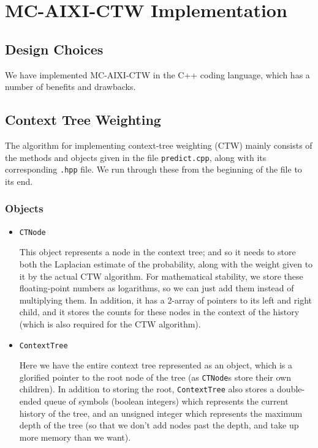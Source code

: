 \documentclass[pdftex,twoside,a4paper]{report}
\begin{document}
\chapter{MC-AIXI-CTW Implementation}
\section{Design Choices}

We have implemented MC-AIXI-CTW in the C++ coding language, which has a number of benefits and drawbacks. 

\section{Context Tree Weighting}
The algorithm for implementing context-tree weighting (CTW) mainly consists of the methods and objects given in the file \texttt{predict.cpp}, along with its corresponding \texttt{.hpp} file. We run through these from the beginning of the file to its end.  

\subsection{Objects}
\begin{itemize}
\item{\texttt{CTNode}

This object represents a node in the context tree; and so it needs to store both the Laplacian estimate of the probability, along with the weight given to it by the actual CTW algorithm. For mathematical stability, we store these floating-point numbers as logarithms, so we can just add them instead of multiplying them. In addition, it has a 2-array of pointers to its left and right child, and it stores the counts for these nodes in the context of the history (which is also required for the CTW algorithm).
  }
\item{\texttt{ContextTree}

Here we have the entire context tree represented as an object, which is a glorified pointer to the root node of the tree (as \texttt{CTNode}s store their own children). In addition to storing the root, \texttt{ContextTree} also stores a double-ended queue of symbols (boolean integers) which represents the current history of the tree, and an unsigned integer which represents the maximum depth of the tree (so that we don't add nodes past the depth, and take up more memory than we want).
  }
\end{itemize}
\end{document}
